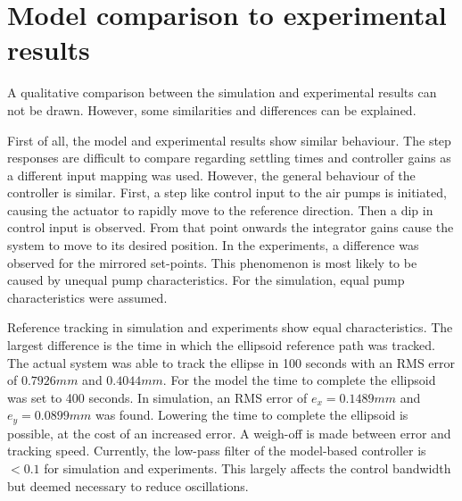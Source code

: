  

\section{Model comparison to experimental results}

A qualitative comparison between the simulation and experimental results can not be drawn. However, some similarities and differences can be explained. 

First of all, the model and experimental results show similar behaviour. The step responses are difficult to compare regarding settling times and controller gains as a different input mapping was used. However, the general behaviour of the controller is similar. First, a step like control input to the air pumps is initiated, causing the actuator to rapidly move to the reference direction. Then a dip in control input is observed. From that point onwards the integrator gains cause the system to move to its desired position. In the experiments, a difference was observed for the mirrored set-points. This phenomenon is most likely to be caused by unequal pump characteristics. For the simulation, equal pump characteristics were assumed. 

Reference tracking in simulation and experiments show equal characteristics. The largest difference is the time in which the ellipsoid reference path was tracked. The actual system was able to track the ellipse in 100 seconds with an RMS error of $0.7926 mm$ and $0.4044 mm$. For the model the time to complete the ellipsoid was set to 400 seconds. In simulation, an RMS error of $e_x = 0.1489 mm$ and $e_y = 0.0899 mm$ was found. Lowering the time to complete the ellipsoid is possible, at the cost of an increased error. A weigh-off is made between error and tracking speed. Currently, the low-pass filter of the model-based controller is $<0.1$ for simulation and experiments. This largely affects the control bandwidth but deemed necessary to reduce oscillations. 

































